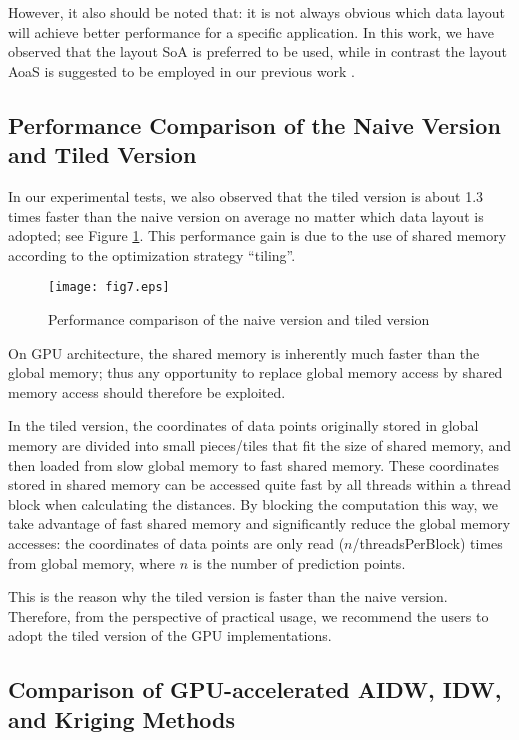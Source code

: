 \documentclass[fleqn,11pt]{wlscirep}
\begin{document}
However, it also should be noted that: it is not always obvious which data 
layout will achieve better performance for a specific application. In this 
work, we have observed that the layout SoA is preferred to be used, while in 
contrast the layout AoaS is suggested to be employed in our previous work \cite{31}.


\subsection{Performance Comparison of the Naive Version and Tiled Version}

In our experimental tests, we also observed that the tiled version is about 
1.3 times faster than the naive version on average no matter which data 
layout is adopted; see Figure \ref{fig7:naive vs tiled}. This performance gain is due to the use of 
shared memory according to the optimization strategy ``tiling''. 

\begin{figure}[ht]
	\centering
	\texttt{[image: fig7.eps]}
	\caption{Performance comparison of the naive version and tiled version}
	\label{fig7:naive vs tiled}
\end{figure}


On GPU architecture, the shared memory is inherently much faster than the 
global memory; thus any opportunity to replace global memory access by 
shared memory access should therefore be exploited. 

In the tiled version, the coordinates of data points originally stored in 
global memory are divided into small pieces/tiles that fit the size of 
shared memory, and then loaded from slow global memory to fast shared 
memory. These coordinates stored in shared memory can be accessed quite fast 
by all threads within a thread block when calculating the distances. By 
blocking the computation this way, we take advantage of fast shared memory 
and significantly reduce the global memory accesses: the coordinates of data 
points are only read ($n$/threadsPerBlock) times from global memory, where 
$n$ is the number of prediction points.

This is the reason why the tiled version is faster than the naive version. 
Therefore, from the perspective of practical usage, we recommend the users 
to adopt the tiled version of the GPU implementations.


\subsection{Comparison of GPU-accelerated AIDW, IDW, and Kriging Methods}
\end{document}
